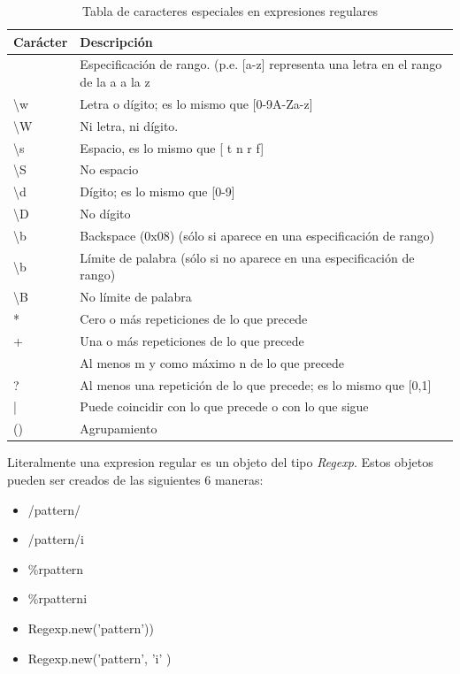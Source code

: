 \documentclass{article}
\begin{document}
\begin{table}[!hbt]
	\begin{center}
	\begin{tabular}{| l | l |}
		\hline
		\rowcolor[gray]{0.9}\textbf{Carácter} & \textbf{Descripción} \\
		\hline
		[] & Especificación de rango. (p.e. [a-z] representa una letra en el rango de la a a la z \\
		\hline
		\textbackslash w & Letra o dígito; es lo mismo que [0-9A-Za-z] \\
		\hline
		\textbackslash W & Ni letra, ni dígito. \\
		\hline
		\textbackslash s & Espacio, es lo mismo que [ t n r f] \\
		\hline
		\textbackslash S & No espacio \\
		\hline
		\textbackslash d & Dígito; es lo mismo que [0-9] \\
		\hline
		\textbackslash D & No dígito \\
		\hline
		\textbackslash b & Backspace (0x08) (sólo si aparece en una especificación de rango) \\
		\hline
		\textbackslash b & Límite de palabra (sólo si no aparece en una especificación de rango) \\
		\hline
		\textbackslash B & No límite de palabra \\
		\hline
		* & Cero o más repeticiones de lo que precede	\\
		\hline
		+ & Una o más repeticiones de lo que precede \\
		\hline
		[m,n] & Al menos m y como máximo n de lo que precede \\
		\hline
		? & Al menos una repetición de lo que precede; es lo mismo que [0,1]	\\
		\hline
		| & Puede coincidir con lo que precede o con lo que sigue \\
		\hline
		() & Agrupamiento \\
		\hline
	\end{tabular}
	\caption{Tabla de caracteres especiales en expresiones regulares}
	\end{center}

\end{table}


	Literalmente una expresion regular es un objeto del tipo \textit{Regexp}. Estos objetos pueden ser creados de las siguientes 6 maneras:

\begin{itemize}
	\itemsep=1pt \topsep=0pt \partopsep=0pt \parskip=0pt \parsep=0pt
	\item  /pattern/              
	\item  /pattern/i 
	\item  \%r{pattern}
	\item \%r{pattern}i
	\item  Regexp.new('pattern'))
	\item  Regexp.new('pattern', 'i' )
\end{itemize}
\bigskip
\end{document}
